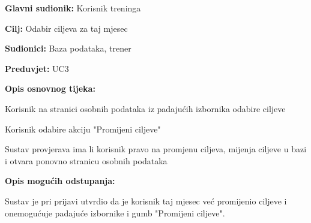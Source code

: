 				
				\noindent {}				\begin{packed_item}
						
						\item \textbf{Glavni sudionik: }Korisnik treninga
						\item  \textbf{Cilj:} Odabir ciljeva za taj mjesec
						\item  \textbf{Sudionici:} Baza podataka, trener
						\item  \textbf{Preduvjet:} UC3  
						\item  \textbf{Opis osnovnog tijeka:}
						
						\item[] \begin{packed_enum}

							\item Korisnik na stranici osobnih podataka iz padajućih izbornika odabire ciljeve
							\item Korisnik odabire akciju "Promijeni ciljeve"
							\item Sustav provjerava ima li korisnik pravo na promjenu ciljeva, mijenja ciljeve u bazi i otvara ponovno stranicu osobnih podataka

							
						\end{packed_enum}
						
						\item  \textbf{Opis mogućih odstupanja:}
						
						\begin{packed_enum}
							
							\item[1.a] Sustav je pri prijavi utvrdio da je korisnik taj mjesec već promijenio ciljeve i onemogućuje padajuće izbornike i gumb "Promijeni ciljeve".
							
						\end{packed_enum}
						
					\end{packed_item}
				
